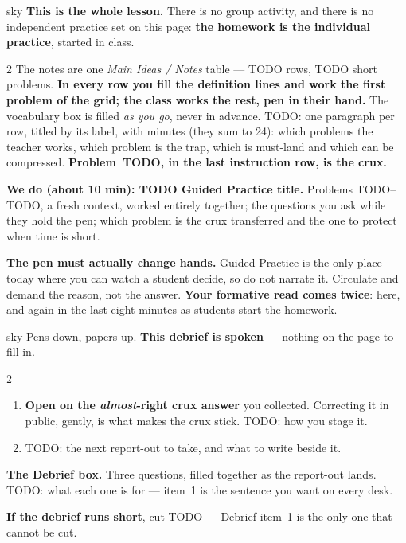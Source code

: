 \documentclass[10pt]{article}
\begin{document}
\boxguard
\begin{skillbox}{sky}
\textbf{This is the whole lesson.} There is no group activity, and there is no independent
practice set on this page: \textbf{the homework is the individual practice}, started in class.
\begin{multicols}{2}
The notes are one \emph{Main Ideas / Notes} table --- TODO rows, TODO short problems.
\textbf{In every row you fill the definition lines and work the first problem of the grid; the
class works the rest, pen in their hand.} The vocabulary box is filled \emph{as you go}, never in
advance. TODO: one paragraph per row, titled by its label, with minutes (they sum to 24): which
problems the teacher works, which problem is the trap, which is must-land and which can be
compressed. \textbf{Problem~TODO, in the last instruction row, is the crux.}

\textbf{We do (about 10 min): TODO Guided Practice title.} Problems TODO--TODO, a fresh context,
worked entirely together; the questions you ask while they hold the pen; which problem is the
crux transferred and the one to protect when time is short.

\columnbreak
\textbf{The pen must actually change hands.} Guided Practice is the only place today where you
can watch a student decide, so do not narrate it. Circulate and demand the reason, not the
answer. \textbf{Your formative read comes twice}: here, and again in the last eight minutes as
students start the homework.
\end{multicols}
\end{skillbox}

\boxguard
\begin{skillbox}{sky}
Pens down, papers up. \textbf{This debrief is spoken} --- nothing on the page to fill in.
\begin{multicols}{2}
\begin{enumerate}[leftmargin=1.3em, nosep, itemsep=3pt]
  \item \textbf{Open on the \emph{almost}-right crux answer} you collected. Correcting it in
        public, gently, is what makes the crux stick. TODO: how you stage it.
  \item TODO: the next report-out to take, and what to write beside it.
\end{enumerate}
\columnbreak
\textbf{The Debrief box.} Three questions, filled together as the report-out lands. TODO: what
each one is for --- item~1 is the sentence you want on every desk.

\textbf{If the debrief runs short}, cut TODO --- Debrief item~1 is the only one that cannot
be cut.
\end{multicols}
\end{skillbox}
\end{document}
